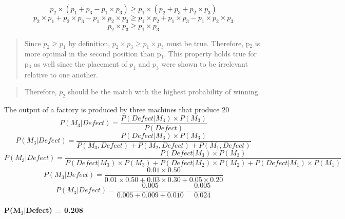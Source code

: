 \documentclass[11pt]{article}
\newenvironment{problem}[2][Problem]{\begin{trivlist}
\item[\hskip \labelsep {\bfseries #1}\hskip \labelsep {\bfseries #2.}]}{\end{trivlist}}
\begin{document}
\begin{problem}{2}
\begin{equation}
		p_2 \times (p_1 + p_3 - p_1 \times p_3) \geq p_1 \times (p_2 + p_3 + p_2 \times p_3)
	\end{equation}
	\begin{equation}
		p_2 \times p_1 + p_2 \times p_3 - p_1 \times p_2 \times p_3 \geq p_1 \times p_2 + p_1 \times p_3 - p_1 \times p_2 \times p_3
	\end{equation}
	\begin{equation}
		p_2 \times p_3 \geq p_1 \times p_3
	\end{equation}
	\begin{verse}
		Since $p_2 \geq p_1$ by definition, $p_2 \times p_3 \geq p_1 \times p_3$ must be true. Therefore, p$_2$ is more optimal in the second position than p$_1$. This property holds true for p$_3$ as well since the placement of $p_1$ and $p_3$ were shown to be irrelevant relative to one another.
	\end{verse}
	\begin{verse}
		Therefore, $p_2$ should be the match with the highest probability of winning.
	\end{verse}
\end{problem}
\begin{problem}{3}
	The output of a factory is produced by three machines that produce 20%
	\begin{equation}
		P(M_3|Defect) = \frac{P(Defect|M_3) \times P(M_3)}{P(Defect)}
	\end{equation}
	\begin{equation}
		P(M_3|Defect) = \frac{P(Defect|M_3) \times P(M_3)}{P(M_3, Defect) + P(M_2, Defect) + P(M_1, Defect)}
	\end{equation}
	\begin{equation}
		P(M_3|Defect) = \frac{P(Defect|M_3) \times P(M_3)}{P(Defect|M_3) \times P(M_3) + P(Defect|M_2) \times P(M_2) + P(Defect|M_1) \times P(M_1)}
	\end{equation}
	\begin{equation}
		P(M_3|Defect) = \frac{0.01 \times 0.50}{0.01 \times 0.50 + 0.03 \times 0.30 + 0.05 \times 0.20}
	\end{equation}
	\begin{equation}
		P(M_3|Defect) = \frac{0.005}{0.005 + 0.009 + 0.010} = \frac{0.005}{0.024}
	\end{equation}
	\begin{center}
		\textbf{P(M$_3|$Defect) = 0.208}
	\end{center}
\end{problem}
\end{document}
